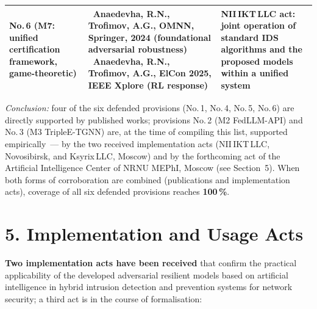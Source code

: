 \documentclass[11pt,a4paper]{article}
\begin{document}
\begin{longtable}{>{\raggedright\arraybackslash}p{} >{\raggedright\arraybackslash}p{} >{\centering\arraybackslash}p{}}
\textbf{No.\,6} (M7: unified certification framework, game-theoretic) &
[4]~Anaedevha, R.N., Trofimov, A.G., OMNN, Springer, 2024 (foundational adversarial robustness) \newline
[6]~Anaedevha, R.N., Trofimov, A.G., ElCon 2025, IEEE Xplore (RL response) &
NII\,IKT\,LLC act: joint operation of standard IDS algorithms and the proposed models within a unified system \\
\bottomrule
\end{longtable}

\textit{Conclusion:} four of the six defended provisions (No.\,1, No.\,4, No.\,5, No.\,6) are directly supported by published works; provisions No.\,2 (M2 FedLLM-API) and No.\,3 (M3 TripleE-TGNN) are, at the time of compiling this list, supported empirically~--- by the two received implementation acts (NII\,IKT\,LLC, Novosibirsk, and Ksyrix\,LLC, Moscow) and by the forthcoming act of the Artificial Intelligence Center of NRNU MEPhI, Moscow (see Section~5). When both forms of corroboration are combined (publications and implementation acts), coverage of all six defended provisions reaches \textbf{100\,\%}.

\vspace{-0.2cm}

\section*{5. Implementation and Usage Acts}

\textbf{Two implementation acts have been received} that confirm the practical applicability of the developed adversarial resilient models based on artificial intelligence in hybrid intrusion detection and prevention systems for network security; a third act is in the course of formalisation:
\end{document}
